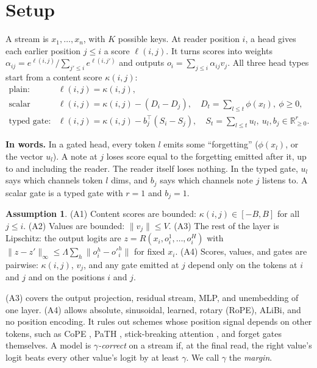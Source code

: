 \documentclass[10pt]{article}
\theoremstyle{definition}
\newtheorem{assumption}{Assumption}
\theoremstyle{remark}
\newcommand{\R}{\mathbb{R}}
\newcommand{\inwords}[1]{\par\smallskip\noindent\textbf{In words.} #1\par\smallskip}
\begin{document}
\section{Setup}\label{sec:setup}

A stream is $x_1, \dots, x_n$, with $K$ possible keys. At reader position $i$, a head gives each earlier position $j \le i$ a score $\ell(i,j)$. It turns scores into weights $\alpha_{ij} = e^{\ell(i,j)} / \sum_{j' \le i} e^{\ell(i,j')}$ and outputs $o_i = \sum_{j \le i} \alpha_{ij} v_j$. All three head types start from a content score $\kappa(i,j)$:
\begin{align*}
\text{plain:}\quad & \ell(i,j) = \kappa(i,j),\\
\text{scalar gate:}\quad & \ell(i,j) = \kappa(i,j) - (D_i - D_j), \quad D_t = \textstyle\sum_{l \le t} \phi(x_l),\ \phi \ge 0,\\
\text{typed gate:}\quad & \ell(i,j) = \kappa(i,j) - b_j^\top (S_i - S_j), \quad S_t = \textstyle\sum_{l \le t} u_l,\ u_l, b_j \in \R^r_{\ge 0}.
\end{align*}
\inwords{In a gated head, every token $l$ emits some ``forgetting'' ($\phi(x_l)$, or the vector $u_l$). A note at $j$ loses score equal to the forgetting emitted after it, up to and including the reader. The reader itself loses nothing. In the typed gate, $u_l$ says which channels token $l$ dims, and $b_j$ says which channels note $j$ listens to. A scalar gate is a typed gate with $r = 1$ and $b_j = 1$.}

\begin{assumption}\label{ass}
(A1) Content scores are bounded: $\kappa(i,j) \in [-B, B]$ for all $j \le i$. (A2) Values are bounded: $\|v_j\| \le V$. (A3) The rest of the layer is Lipschitz: the output logits are $z = R(x_i, o^1_i, \dots, o^H_i)$ with $\|z - z'\|_\infty \le \Lambda \sum_h \|o^h_i - o'^h_i\|$ for fixed $x_i$. (A4) Scores, values, and gates are pairwise: $\kappa(i,j)$, $v_j$, and any gate emitted at $j$ depend only on the tokens at $i$ and $j$ and on the positions $i$ and $j$.
\end{assumption}

(A3) covers the output projection, residual stream, MLP, and unembedding of one layer. (A4) allows absolute, sinusoidal, learned, rotary (RoPE), ALiBi, and no position encoding. It rules out schemes whose position signal depends on other tokens, such as CoPE \cite{cope}, PaTH \cite{path}, stick-breaking attention \cite{stickbreaking}, and forget gates themselves. A model is \emph{$\gamma$-correct} on a stream if, at the final read, the right value's logit beats every other value's logit by at least $\gamma$. We call $\gamma$ the \emph{margin}.
\end{document}
